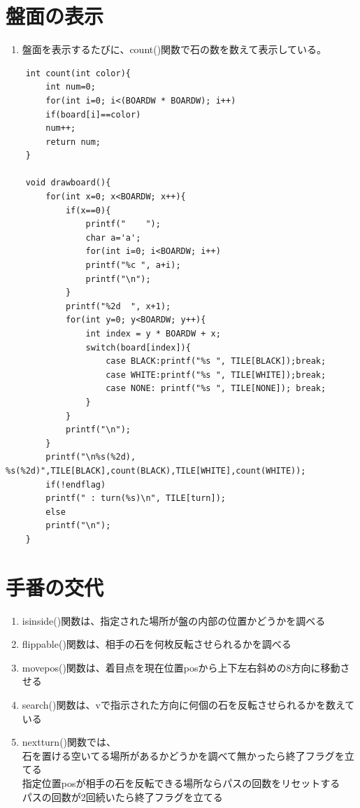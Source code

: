 \documentclass[uplatex,a4paper,11pt,oneside,openany]{jsbook}
\begin{document}
\section{盤面の表示}

\begin{enumerate}
	\item 盤面を表示するたびに、count()関数で石の数を数えて表示している。
\end{enumerate}

\begin{lstlisting}
	int count(int color){
		int num=0;
		for(int i=0; i<(BOARDW * BOARDW); i++)
		if(board[i]==color)
		num++;
		return num;
	}
	
	void drawboard(){
		for(int x=0; x<BOARDW; x++){
			if(x==0){
				printf("    ");
				char a='a';
				for(int i=0; i<BOARDW; i++)
				printf("%c ", a+i);
				printf("\n");
			}
			printf("%2d  ", x+1);
			for(int y=0; y<BOARDW; y++){
				int index = y * BOARDW + x;
				switch(board[index]){
					case BLACK:printf("%s ", TILE[BLACK]);break;
					case WHITE:printf("%s ", TILE[WHITE]);break;
					case NONE: printf("%s ", TILE[NONE]); break;
				}
			}
			printf("\n");
		}
		printf("\n%s(%2d), %s(%2d)",TILE[BLACK],count(BLACK),TILE[WHITE],count(WHITE));
		if(!endflag)
		printf(" : turn(%s)\n", TILE[turn]);
		else
		printf("\n");
	}
\end{lstlisting}

\section{手番の交代}

\begin{enumerate}
	\item isinside()関数は、指定された場所が盤の内部の位置かどうかを調べる
	\item flippable()関数は、相手の石を何枚反転させられるかを調べる
	\item movepos()関数は、着目点を現在位置posから上下左右斜めの8方向に移動させる
	\item search()関数は、vで指示された方向に何個の石を反転させられるかを数えている
	\item nextturn()関数では、\\石を置ける空いてる場所があるかどうかを調べて無かったら終了フラグを立てる\\
	指定位置posが相手の石を反転できる場所ならパスの回数をリセットする\\
	パスの回数が2回続いたら終了フラグを立てる
\end{enumerate}
\end{document}
